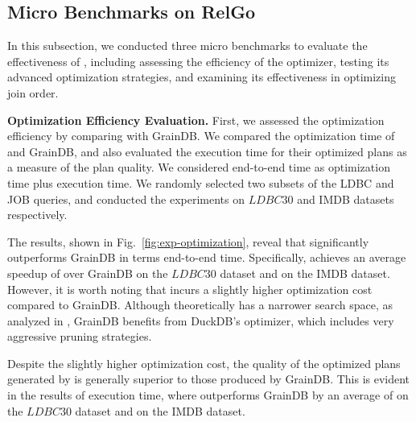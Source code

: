 
\subsection{Micro Benchmarks on RelGo}
\label{sec:experiment-opt}
In this subsection, we conducted three micro benchmarks to evaluate the effectiveness of \name,
including assessing the efficiency of the optimizer, testing its advanced optimization strategies, and examining its effectiveness in optimizing join order.

\noindent\textbf{Optimization Efficiency Evaluation.}
First, we assessed the optimization efficiency by comparing \name with GrainDB\cite{graindb}.
We compared the optimization time of \name and GrainDB, and also evaluated the execution time for their optimized plans as a measure of the plan quality.
We considered end-to-end time as optimization time plus execution time.
We randomly selected two subsets of the LDBC and JOB queries, and conducted the experiments on $LDBC30$ and IMDB datasets respectively.

The results, shown in Fig.~\ref{fig:exp-optimization}, reveal that \name significantly outperforms GrainDB in terms end-to-end time.
Specifically, \name achieves an average speedup of \revise{$7.5\times$} over GrainDB on the $LDBC30$ dataset and \revise{$3.8\times$} on the IMDB dataset.
However, it is worth noting that \name incurs a slightly higher optimization cost compared to GrainDB. Although \name theoretically has a narrower search space, as analyzed in , GrainDB benefits from DuckDB's optimizer, which includes very aggressive pruning strategies.

Despite the slightly higher optimization cost, the quality of the optimized plans generated by \name is generally superior to those produced by GrainDB. This is evident in the results of execution time, where \name outperforms GrainDB by an average of \revise{$9.7\times$} on the $LDBC30$ dataset and \revise{$4.3\times$} on the IMDB dataset. %


